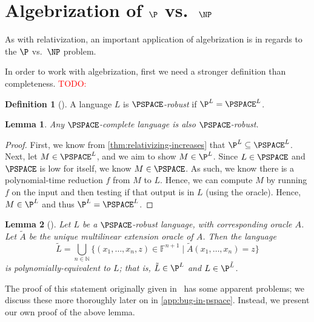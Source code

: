 \documentclass[english,12pt]{reedthesis}
\theoremstyle{plain}
\newtheorem{lemma}[lemma]{Lemma}
\theoremstyle{definition}
\newtheorem{defn}[defn]{Definition}
\theoremstyle{remark}
\newcommand{\TODO}[1]{\textcolor{red}{TODO: #1}}
\begin{document}
\section{Algebrization of $\P$ vs.\ $\NP$}\label{sec:alg-p-np}

As with relativization, an important application of algebrization is in regards
to the $\P$ vs.\ $\NP$ problem.

In order to work with algebrization, first we need a stronger definition than
completeness. \TODO{}

\begin{defn}[{\cite[Def.\ 6.1]{BFL90}}]\label{def:pspace-robust}
  A language $L$ is \emph{$\PSPACE$-robust} if $\P^{L} = \PSPACE^{L}$.
\end{defn}

\begin{lemma}\label{lem:complete-is-robust}
  Any $\PSPACE$-complete language is also $\PSPACE$-robust.
\end{lemma}

\begin{proof}
  First, we know from \cref{thm:relativizing-increases} that
  $\P^{L} \subseteq \PSPACE^{L}$. Next, let $M \in \PSPACE^{L}$, and we aim to show
  $M \in \P^{L}$. Since $L \in \PSPACE$ and $\PSPACE$ is low for itself, we know
  $M \in \PSPACE$. As such, we know there is a polynomial-time reduction $f$ from
  $M$ to $L$. Hence, we can compute $M$ by running $f$ on the input and then
  testing if that output is in $L$ (using the oracle). Hence, $M \in \P^{L}$ and
  thus $\P^{L} = \PSPACE^{L}$.
\end{proof}

\begin{lemma}[{\cite[Lemma 6.2]{BFL90}}]\label{lem:multilinear-is-pspace}
  Let $L$ be a $\PSPACE$-robust language, with corresponding oracle $A$. Let
  $\tilde{A}$ be the unique multilinear extension oracle of $A$. Then the
  language
  \begin{equation}
    \tilde{L} = \bigcup_{n \in \mathbb{N}}\{(x_{1}, \ldots, x_{n}, z) \in \mathbb{F}^{n+1} \mid \tilde{A}(x_{1}, \ldots, x_{n}) = z\}
  \end{equation}
  is polynomially-equivalent to $L$; that is, $\tilde{L} \in \P^{L}$ and
  $L \in \P^{\tilde{L}}$.
\end{lemma}

The proof of this statement originally given in~\cite{BFL90} has some apparent
problems; we discuss these more thoroughly later on in \cref{app:bug-in-pspace}.
Instead, we present our own proof of the above lemma.
\end{document}
